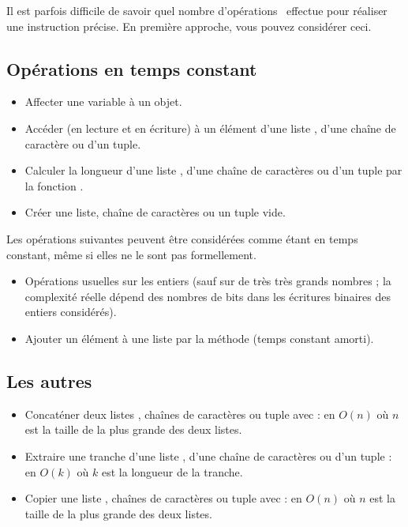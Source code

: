 Il est parfois difficile de savoir quel nombre d'opérations \python\ effectue pour réaliser une instruction précise. 
En première approche, vous pouvez considérer ceci.

\subsection{Opérations en temps constant}

\begin{itemize}
  \item[\textbullet] Affecter une variable à un objet.
  \item[\textbullet] Accéder (en lecture et en écriture) à un élément d'une liste \python, d'une chaîne de caractère ou d'un tuple. 
  \item[\textbullet] Calculer la longueur d'une liste \python, d'une chaîne de caractères ou d'un tuple par la fonction .
  \item[\textbullet] Créer une liste, chaîne de caractères ou un tuple vide.
\end{itemize}

Les opérations suivantes peuvent être considérées comme étant en temps constant, même si elles ne le sont pas formellement.

\begin{itemize}
  \item[\textbullet] Opérations usuelles sur les entiers (sauf sur de très très grands nombres ; la complexité réelle dépend des nombres de bits dans les écritures binaires des entiers considérés).
  \item[\textbullet] Ajouter un élément à une liste par la méthode  (temps constant amorti).
\end{itemize}

\subsection{Les autres}

\begin{itemize}
  \item[\textbullet] Concaténer deux listes \python, chaînes de caractères ou tuple avec \pyv{+} : en $O(n)$ où $n$ est la taille de la plus grande des deux listes.
  \item[\textbullet] Extraire une tranche d'une liste \python, d'une chaîne de caractères ou d'un tuple : en $O(k)$ où $k$ est la longueur de la tranche.
  \item[\textbullet] Copier une liste \python, chaînes de caractères ou tuple avec  : en $O(n)$ où $n$ est la taille de la plus grande des deux listes.
\end{itemize}

